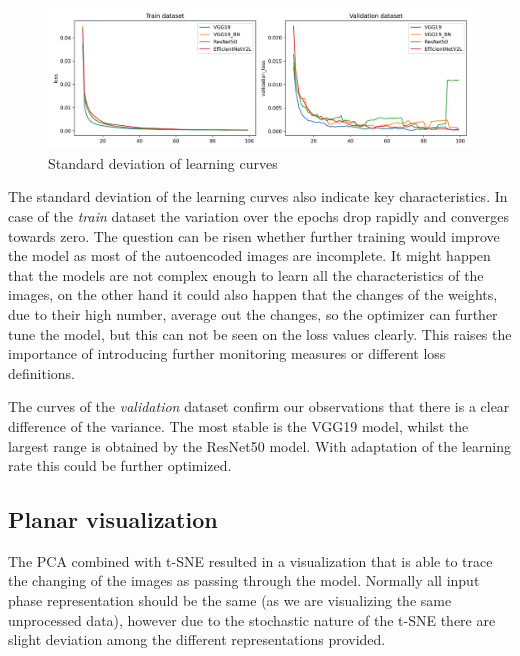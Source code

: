 \begin{figure}[!ht]
    \centering
    \includegraphics[width=\textwidth]{./results/comparison/stdevs.png}
    \caption{Standard deviation of learning curves}
    \label{fig:learning_curve_stdevs}
\end{figure}

The standard deviation of the learning curves also indicate key characteristics.
In case of the \emph{train} dataset the variation over the epochs drop rapidly
and converges towards zero.
The question can be risen whether further training would improve the model
as most of the autoencoded images are incomplete.
It might happen that the models are not complex enough to learn all the characteristics
of the images, on the other hand it could also happen that the changes of the weights,
due to their high number, average out the changes, so the optimizer can further tune
the model, but this can not be seen on the loss values clearly.
This raises the importance of introducing further monitoring measures
or different loss definitions.

The curves of the \emph{validation} dataset confirm our observations that there is a clear
difference of the variance.
The most stable is the VGG19 model, whilst the largest range is obtained by the ResNet50 model.
With adaptation of the learning rate this could be further optimized.

\subsection{Planar visualization}
The PCA combined with t-SNE resulted in a visualization that is able to trace the changing of
the images as passing through the model.
Normally all input phase representation should be the same (as we are visualizing the same
unprocessed data), however due to the stochastic nature of the t-SNE there are slight deviation
among the different representations provided.

